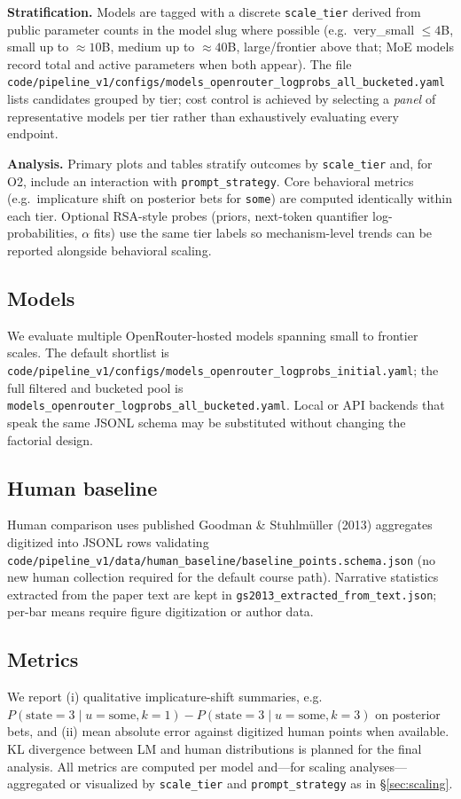 \documentclass[11pt]{article}
\begin{document}
\textbf{Stratification.} Models are tagged with a discrete \texttt{scale\_tier} derived from public parameter counts in the model slug where possible (e.g.\ very\_small $\leq 4$B, small up to $\approx 10$B, medium up to $\approx 40$B, large/frontier above that; MoE models record total and active parameters when both appear). The file \texttt{code/pipeline\_v1/configs/models\_openrouter\_logprobs\_all\_bucketed.yaml} lists candidates grouped by tier; cost control is achieved by selecting a \emph{panel} of representative models per tier rather than exhaustively evaluating every endpoint.

\textbf{Analysis.} Primary plots and tables stratify outcomes by \texttt{scale\_tier} and, for O2, include an interaction with \texttt{prompt\_strategy}. Core behavioral metrics (e.g.\ implicature shift on posterior bets for \texttt{some}) are computed identically within each tier. Optional RSA-style probes (priors, next-token quantifier log-probabilities, $\alpha$ fits) use the same tier labels so mechanism-level trends can be reported alongside behavioral scaling.

\subsection{Models}
We evaluate multiple OpenRouter-hosted models spanning small to frontier scales. The default shortlist is \texttt{code/pipeline\_v1/configs/models\_openrouter\_logprobs\_initial.yaml}; the full filtered and bucketed pool is \texttt{models\_openrouter\_logprobs\_all\_bucketed.yaml}. Local or API backends that speak the same JSONL schema may be substituted without changing the factorial design.

\subsection{Human baseline}
Human comparison uses published Goodman \& Stuhlm\"{u}ller (2013) aggregates digitized into JSONL rows validating \texttt{code/pipeline\_v1/data/human\_baseline/baseline\_points.schema.json} (no new human collection required for the default course path). Narrative statistics extracted from the paper text are kept in \texttt{gs2013\_extracted\_from\_text.json}; per-bar means require figure digitization or author data.

\subsection{Metrics}
We report (i) qualitative implicature-shift summaries, e.g.\ $P(\text{state}=3 \mid u{=}\text{some}, k{=}1) - P(\text{state}=3 \mid u{=}\text{some}, k{=}3)$ on posterior bets, and (ii) mean absolute error against digitized human points when available. KL divergence between LM and human distributions is planned for the final analysis. All metrics are computed per model and---for scaling analyses---aggregated or visualized by \texttt{scale\_tier} and \texttt{prompt\_strategy} as in \S\ref{sec:scaling}.
\end{document}
